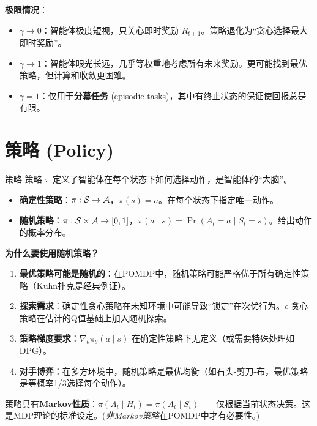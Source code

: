 \textbf{极限情况}：
\begin{itemize}
    \item $\gamma \to 0$：智能体极度短视，只关心即时奖励 $R_{t+1}$。策略退化为``贪心选择最大即时奖励''。
    \item $\gamma \to 1$：智能体眼光长远，几乎等权重地考虑所有未来奖励。更可能找到最优策略，但计算和收敛更困难。
    \item $\gamma = 1$：仅用于\textbf{分幕任务} (episodic tasks)，其中有终止状态的保证使回报总是有限。
\end{itemize}

\section{策略 (Policy)}

\begin{mydefinition}{策略}
策略 $\pi$ 定义了智能体在每个状态下如何选择动作，是智能体的``大脑''。
\begin{itemize}
    \item \textbf{确定性策略}：$\pi: \mathcal{S} \to \mathcal{A}$，$\pi(s) = a$。在每个状态下指定唯一动作。
    \item \textbf{随机策略}：$\pi: \mathcal{S} \times \mathcal{A} \to [0, 1]$，$\pi(a \mid s) = \Pr(A_t = a \mid S_t = s)$。给出动作的概率分布。
\end{itemize}
\end{mydefinition}

\textbf{为什么要使用随机策略？}
\begin{enumerate}
    \item \textbf{最优策略可能是随机的}：在POMDP中，随机策略可能严格优于所有确定性策略（Kuhn扑克是经典例证）。
    \item \textbf{探索需求}：确定性贪心策略在未知环境中可能导致``锁定''在次优行为。$\epsilon$-贪心策略在估计的Q值基础上加入随机探索。
    \item \textbf{策略梯度要求}：$\nabla_\theta \pi_\theta(a \mid s)$ 在确定性策略下无定义（或需要特殊处理如DPG）。
    \item \textbf{对手博弈}：在多方环境中，随机策略是最优均衡（如石头-剪刀-布，最优策略是等概率1/3选择每个动作）。
\end{enumerate}

策略具有\textbf{Markov性质}：$\pi(A_t \mid H_t) = \pi(A_t \mid S_t)$——仅根据当前状态决策。这是MDP理论的标准设定。(\emph{非Markov策略}在POMDP中才有必要性。)

